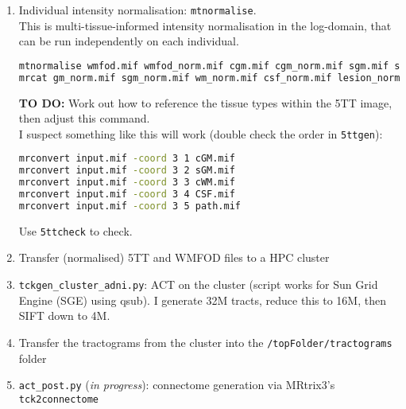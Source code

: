 \documentclass[12pt]{elsarticle}
\newcommand{\topFolder}{\texttt{/topFolder}}
\begin{document}
$$\begin{enumerate}
\begin{enumerate}
\begin{enumerate}
\begin{center}
\begin{tabular}{c|c}
				\verb|gif3_default.txt| & \verb|fs_default.txt|    \\ 
				\verb|gif3.py|          & \verb|freesurfer.py|     \\ 
				\verb|GIF32ACT*.txt|    & \verb|FreeSurfer2ACT.txt| \\ 
			\end{tabular}\end{center} 
			Finally, the lookup table GIF3ColourLUT.txt needs to go in \verb|GIFDB_HOME| (defined as an environment variable).
			Alternatively, you can modify \verb|gif3.py| to point to the location, or pass the location explicitly to gif3.py (via \texttt{5ttgen} in MRtrix3).
		\end{enumerate}
    \item Individual intensity normalisation: \verb|mtnormalise|. \\
      This is multi-tissue-informed intensity normalisation in the log-domain, that can be run independently on each individual. \\
\begin{lstlisting}[language=bash]
mtnormalise wmfod.mif wmfod_norm.mif cgm.mif cgm_norm.mif sgm.mif sgm_norm.mif csf.mif csf_norm.mif wm.mif wm_norm.mif path.mif path_norm.mif -mask mask.mif
mrcat gm_norm.mif sgm_norm.mif wm_norm.mif csf_norm.mif lesion_norm.mif 5tt_norm.mif -axis 3\end{lstlisting}
      \textbf{TO DO:} Work out how to reference the tissue types within the 5TT image, then adjust this command. \\
      I suspect something like this will work (double check the order in \verb|5ttgen|):
\begin{lstlisting}[language=bash]
mrconvert input.mif -coord 3 1 cGM.mif
mrconvert input.mif -coord 3 2 sGM.mif
mrconvert input.mif -coord 3 3 cWM.mif
mrconvert input.mif -coord 3 4 CSF.mif
mrconvert input.mif -coord 3 5 path.mif\end{lstlisting}
      Use \verb|5ttcheck| to check.
		\item Transfer (normalised) 5TT and WMFOD files to a HPC cluster
		\item \verb|tckgen_cluster_adni.py|: ACT on the cluster (script works for Sun Grid Engine (SGE) using qsub). I generate 32M tracts, reduce this to 16M, then SIFT down to 4M.
		\item Transfer the tractograms from the cluster into the \topFolder\texttt{/tractograms} folder
		\item \verb|act_post.py| (\emph{in progress}): connectome generation via MRtrix3's \texttt{tck2connectome}
	\end{enumerate}
\end{enumerate}
\end{document}
